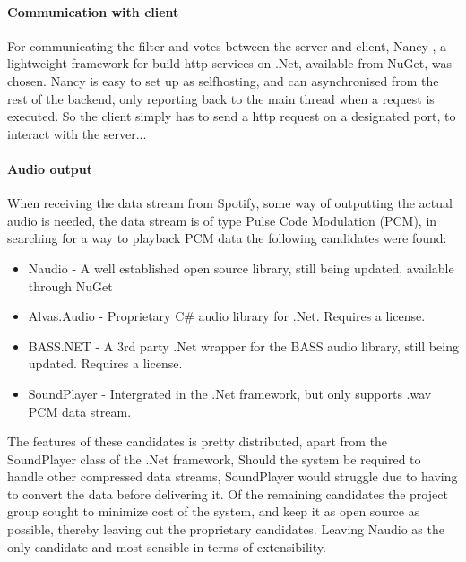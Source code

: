 	\paragraph{Communication with client}
	For communicating the filter and votes between the server and client, Nancy \cite{nancy}, a lightweight framework for build http services on .Net, available from NuGet, was chosen. Nancy is easy to set up as selfhosting, and can asynchronised from the rest of the backend, only reporting back to the main thread when a request is executed. So the client simply has to send a http request on a designated port, to interact with the server...  

	\paragraph{Audio output}
	When receiving the data stream from Spotify, some way of outputting the actual audio is needed, the data stream is of type Pulse Code Modulation (PCM), in searching for a way to playback PCM data the following candidates were found:

\begin{itemize}
	\item Naudio \cite{naudio} - A well established open source library, still being updated, available through NuGet
	\item Alvas.Audio \cite{alvas} - Proprietary C\# audio library for .Net. Requires a license.
	\item BASS.NET \cite{bass} - A 3rd party .Net wrapper for the BASS audio library, still being updated. Requires a license.
	\item SoundPlayer - Intergrated in the .Net framework, but only supports .wav PCM data stream.
\end{itemize}

	The features of these candidates is pretty distributed, apart from the SoundPlayer class of the .Net framework, Should the system be required to handle other compressed data streams, SoundPlayer would struggle due to having to convert the data before delivering it. Of the remaining candidates the project group sought to minimize cost of the system, and keep it as open source as possible, thereby leaving out the proprietary candidates. Leaving Naudio as the only candidate and most sensible in terms of extensibility.